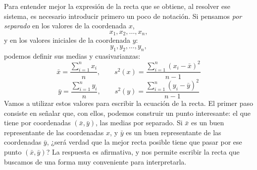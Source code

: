 Para entender mejor la expresión de la recta que se obtiene, al resolver ese sistema, es necesario introducir primero un poco de notación. Si pensamos {\em por separado} en los valores de la coordenada
$x$,
\[x_1, x_2,\ldots, x_n,\]
y en los valores iniciales de la coordenada $y$:
\[y_1, y_2,\ldots, y_n,\]
podemos definir sus medias y cuasivarianzas:
\[\bar x=\dfrac{\displaystyle\sum_{i=1}^{n}x_i}{n},\qquad s^2(x)=\dfrac{\displaystyle\sum_{i=1}^{n}(x_i-\bar x)^2}{n-1}\]
\[\bar y=\dfrac{\displaystyle\sum_{i=1}^{n}y_i}{n},\qquad s^2(y)=\dfrac{\displaystyle\sum_{i=1}^{n}(y_i-\bar y)^2}{n-1}\]
Vamos a utilizar estos valores para escribir la ecuación de la recta. El primer paso consiste en señalar que, con ellos, podemos construir un punto interesante: el que tiene por coordenadas $(\bar x,\bar y)$, las medias por separado. Si $\bar x$ es un buen representante de las coordenadas $x$, y $\bar y$ es un buen representante de las coordenadas $\bar y$, ¿será verdad que la mejor recta posible tiene que pasar por ese punto $(\bar x,\bar y)$? La respuesta es afirmativa, y nos permite escribir la recta que buscamos de una forma muy conveniente para interpretarla.
    \begin{center}
    \end{center}
